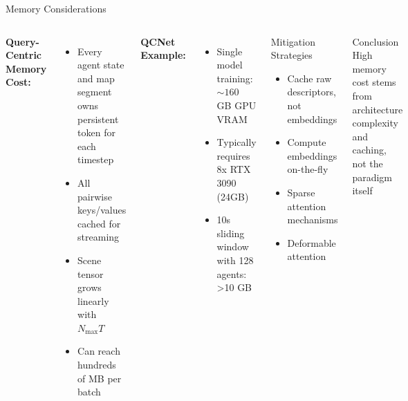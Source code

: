 \documentclass[10pt,aspectratio=169]{beamer}
\begin{document}
\begin{frame}{Memory Considerations}
\begin{columns}[T]
\textbf{Query-Centric Memory Cost:}
\begin{itemize}
    \item Every agent state and map segment owns persistent token for each timestep
    \item All pairwise keys/values cached for streaming
    \item Scene tensor grows linearly with $N_{\max}T$
    \item Can reach hundreds of MB per batch
\end{itemize}

\textbf{QCNet Example:}
\begin{itemize}
    \item Single model training: $\sim 160$ GB GPU VRAM
    \item Typically requires 8x RTX 3090 (24GB)
    \item 10s sliding window with 128 agents: >10 GB
\end{itemize}

\begin{block}{Mitigation Strategies}
\begin{itemize}
    \item Cache raw descriptors, not embeddings
    \item Compute embeddings on-the-fly
    \item Sparse attention mechanisms
    \item Deformable attention
\end{itemize}
\end{block}

\begin{alertblock}{Conclusion}
High memory cost stems from architecture complexity and caching, not the paradigm itself
\end{alertblock}
\end{columns}
\end{frame}
\end{document}
